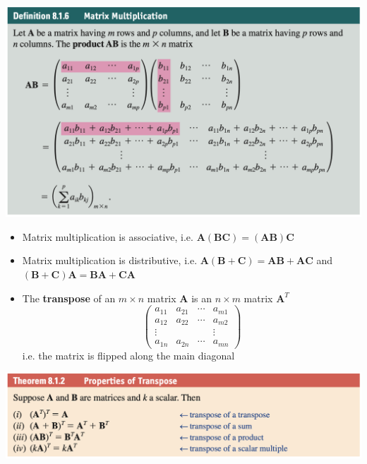 \documentclass{article}
\begin{document}
\includegraphics[scale=0.443]{matrix-multiplication}

\begin{itemize}
  \item Matrix multiplication is associative, i.e. $\mathbf{A} (\mathbf{B} \mathbf{C}) = (\mathbf{A} \mathbf{B}) \mathbf{C}$

  \item Matrix multiplication is distributive, i.e. $\mathbf{A} (\mathbf{B} + \mathbf{C}) = \mathbf{A} \mathbf{B} + \mathbf{A} \mathbf{C}$ and $(\mathbf{B} + \mathbf{C}) \mathbf{A} = \mathbf{B} \mathbf{A} + \mathbf{C} \mathbf{A}$

  \item The \textbf{transpose} of an $m \times n$ matrix $\mathbf{A}$ is an $n \times m$ matrix $\mathbf{A}^T$ \[\begin{pmatrix}
            a_{11} & a_{21} & \cdots & a_{m1} \\
            a_{12} & a_{22} & \cdots & a_{m2} \\
            \vdots &        &        & \vdots \\
            a_{1n} & a_{2n} & \cdots & a_{mn}
          \end{pmatrix}\] i.e. the matrix is flipped along the main diagonal
\end{itemize}

\includegraphics[scale=0.443]{transpose-properties}
\end{document}
